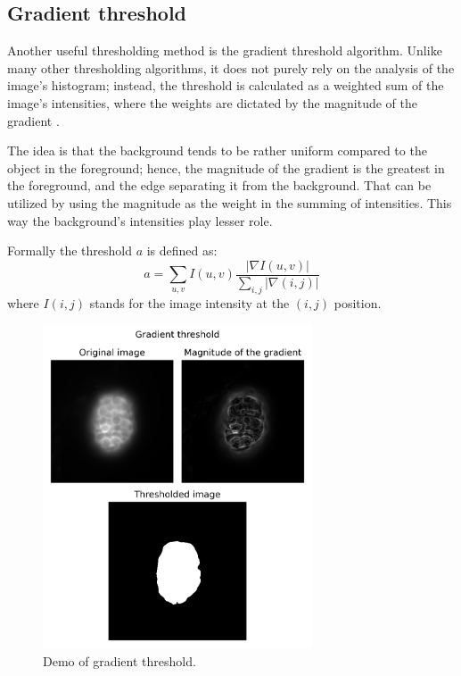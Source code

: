 \documentclass[
  digital,     %
  oneside,     %
  nosansbold,  %
  nocolorbold, %
  lof,         %
  lot,         %
]{fithesis4}
\begin{document}

\subsection{Gradient threshold}

Another useful thresholding method is the gradient threshold algorithm. Unlike
many other thresholding algorithms, it does not purely rely on the analysis of
the image's histogram; instead, the threshold is calculated as a weighted sum of
the image's intensities, where the weights are dictated by the magnitude of the
gradient \cite{pb130}.

The idea is that the background tends to be rather uniform compared to the
object in the foreground; hence, the magnitude of the gradient is the greatest
in the foreground, and the edge separating it from the background. That can be
utilized by using the magnitude as the weight in the summing of intensities.
This way the background's intensities play lesser role.

Formally the threshold $a$ is defined as:
$$a = \sum_{u, v} I(u, v) \frac{|\nabla I(u, v)|}{\sum_{i, j} |\nabla(i,j)|}$$
where $I(i, j)$ stands for the image intensity at the $(i, j)$ position.

\begin{figure}
    \begin{center}
        \includegraphics[width=8cm]{"resources/demo-gradient-threshold.png"}
    \end{center}
    \caption{Demo of gradient threshold.}
    \label{fig:demo_grad_thresh}
\end{figure}
\end{document}

